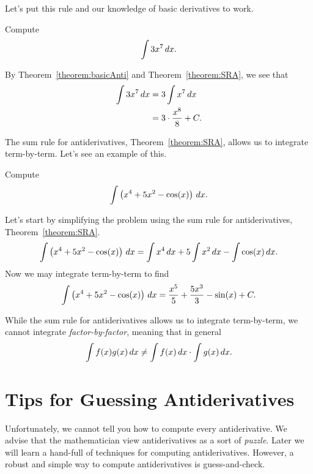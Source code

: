 \documentclass{ximera}
\begin{document}
Let's put this rule and our knowledge of basic derivatives to work.

\begin{example}
Compute
\[
\int 3 x^7 \,d x.
\]


By Theorem~\ref{theorem:basicAnti} and Theorem~\ref{theorem:SRA}, we
see that
\begin{align*}
\int 3 x^7 \,d x &= 3 \int x^7 \,d x\\
&= 3 \cdot \frac{x^8}{8}+C.
\end{align*}
\end{example}

The sum rule for antiderivatives, Theorem~\ref{theorem:SRA}, allows us to integrate term-by-term. Let's see an example of this.

\begin{example}
Compute
\[
\int \left(x^4 + 5x^2 - \cos(x)\right) \,d x.
\]


Let's start by simplifying the problem using the sum rule for
antiderivatives, Theorem~\ref{theorem:SRA}.
\[
\int \left(x^4 + 5x^2 - \cos(x)\right) \,d x = \int x^4 \,d x + 5\int x^2 \,d x - \int \cos(x) \,d x.
\]
Now we may integrate term-by-term to find
\[
\int \left(x^4 + 5x^2 - \cos(x)\right) \,d x = \frac{x^5}{5} + \frac{5x^3}{3}  - \sin(x)+C.
\]
\end{example}


\begin{warning}
While the sum rule for antiderivatives allows us to integrate
term-by-term, we cannot integrate \textit{factor-by-factor}, meaning
that in general
\[
\int f(x)g(x) \,d x \ne \int f(x) \,d x\cdot \int g(x) \,d x.
\]
\end{warning}








\section{Tips for Guessing Antiderivatives}


Unfortunately, we cannot tell you how to compute every antiderivative.
We advise that the mathematician view antiderivatives as a sort of
\textit{puzzle}. Later we will learn a hand-full of techniques for
computing antiderivatives. However, a robust and simple way to compute
antiderivatives is guess-and-check.


\end{document}
